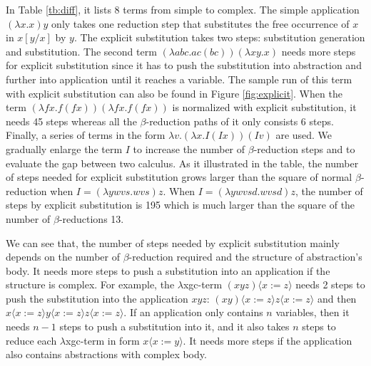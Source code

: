 In Table \ref{tb:diff}, it lists 8 terms from simple to complex. The simple application $(\lambda x.x)y$ only takes one reduction step that substitutes the free occurrence of $x$ in $x[y/x]$ by $y$. The explicit substitution takes two steps: substitution generation and substitution. The second term $(\lambda abc.ac(bc))(\lambda xy.x)$ needs more steps for explicit substitution since it has to push the substitution into abstraction and further into application until it reaches a variable. The sample run of this term with explicit substitution can also be found in Figure \ref{fig:explicit}. When the term $(\lambda fx.f(fx))(\lambda fx.f(fx))$ is normalized with explicit substitution, it needs 45 steps whereas all the $\beta$-reduction paths of it only consists 6 steps. Finally, a series of terms in the form $\lambda v.(\lambda x.I(Ix))(Iv)$ are used. We gradually enlarge the term $I$ to increase the number of $\beta$-reduction steps and to evaluate the gap between two calculus. As it illustrated in the table, the number of steps needed for explicit substitution grows larger than the square of normal $\beta$-reduction when $I = (\lambda ywvs.wvs)z$. When $I = (\lambda ywvsd.wvsd)z$, the number of steps by explicit substitution is 195 which is much larger than the square of the number of $\beta$-reductions 13.

We can see that, the number of steps needed by explicit substitution mainly depends on the number of $\beta$-reduction required and the structure of abstraction's body. It needs more steps to push a substitution into an application if the structure is complex. For example, the $\lambda$xgc-term $(xyz)\langle x:=z\rangle$ needs 2 steps to push the substitution into the application $xyz$:  $(xy)\langle x:=z\rangle z\langle x:=z\rangle$ and then $x\langle x:=z\rangle y\langle x:=z\rangle z\langle x:=z\rangle$. If an application only contains $n$ variables, then it needs $n-1$ steps to push a substitution into it, and it also takes $n$ steps to reduce each $\lambda$xgc-term in form $x\langle x:=y\rangle$. It needs more steps if the application also contains abstractions with complex body. 


